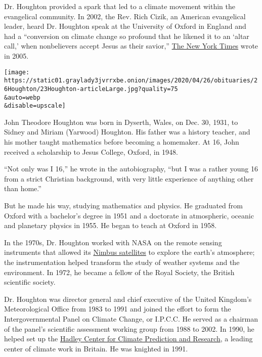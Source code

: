 Dr. Houghton provided a spark that led to a climate movement within the
evangelical community. In 2002, the Rev. Rich Cizik, an American
evangelical leader, heard Dr. Houghton speak at the University of Oxford
in England and had a ``conversion on climate change so profound that he
likened it to an `altar call,' when nonbelievers accept Jesus as their
savior,''
\href{https://www.nytimes3xbfgragh.onion/2005/03/10/us/evangelical-leaders-swing-influence-behind-effort-to-combat-global.html}{The
New York Times} wrote in 2005.

\texttt{[image: https://static01.graylady3jvrrxbe.onion/images/2020/04/26/obituaries/26Houghton/23Houghton-articleLarge.jpg?quality=75\\\&auto=webp\\\&disable=upscale]}

John Theodore Houghton was born in Dyserth, Wales, on Dec. 30, 1931, to
Sidney and Miriam (Yarwood) Houghton. His father was a history teacher,
and his mother taught mathematics before becoming a homemaker. At 16,
John received a scholarship to Jesus College, Oxford, in 1948.

``Not only was I 16,'' he wrote in the autobiography, ``but I was a
rather young 16 from a strict Christian background, with very little
experience of anything other than home.''

But he made his way, studying mathematics and physics. He graduated from
Oxford with a bachelor's degree in 1951 and a doctorate in atmospheric,
oceanic and planetary physics in 1955. He began to teach at Oxford in
1958.

In the 1970s, Dr. Houghton worked with NASA on the remote sensing
instruments that allowed its
\href{https://www.nasa.gov/content/goddard/nimbus-nasa-remembers-first-earth-observations}{Nimbus
satellites} to explore the earth's atmosphere; the instrumentation
helped transform the study of weather systems and the environment. In
1972, he became a fellow of the Royal Society, the British scientific
society.

Dr. Houghton was director general and chief executive of the United
Kingdom's Meteorological Office from 1983 to 1991 and joined the effort
to form the Intergovernmental Panel on Climate Change, or I.P.C.C. He
served as a chairman of the panel's scientific assessment working group
from 1988 to 2002. In 1990, he helped set up the
\href{https://www.metoffice.gov.uk/weather/climate-change/organisations-and-reports/met-office-hadley-centre}{Hadley
Center for Climate Prediction and Research}, a leading center of climate
work in Britain. He was knighted in 1991.

